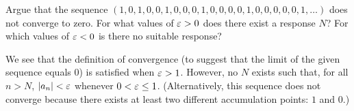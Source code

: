 \begin{problem}
  Argue that the sequence $(1, 0, 1, 0, 0, 1, 0, 0, 0, 1, 0, 0, 0, 0, 1, 0, 0, 0, 0, 0, 1, \ldots)$ 
  does not converge to zero. For what values of $\varepsilon > 0$ does there exist a
  response $N$? For which values of $\varepsilon < 0$ is there no
  suitable response? 

  \vspace{\baselineskip}

    We see that the definition of convergence (to suggest that the limit of the
    given sequence equals $0$) is satisfied when $\varepsilon > 1$. However, no $N$
    exists such that, for all $n > N$, $\left\lvert a_{n} \right\rvert < \varepsilon$ whenever $0 < \varepsilon \leq 1$. 
    (Alternatively, this sequence does not converge because there exists at least
    two different accumulation points: $1$ and $0$.)
\end{problem}

